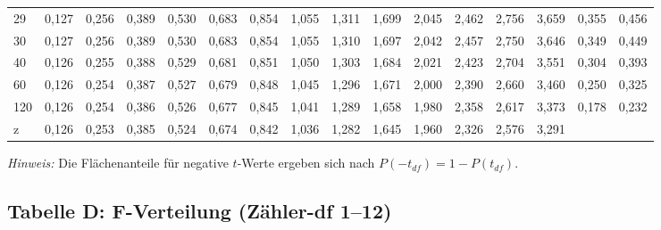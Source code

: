\documentclass[
]{article}
\begin{document}
\begin{table}[!h]
{\begin{tabular}[t]{lccccccccccccccc}
29 & 0,127 & 0,256 & 0,389 & 0,530 & 0,683 & 0,854 & 1,055 & 1,311 & 1,699 & 2,045 & 2,462 & 2,756 & 3,659 & 0,355 & 0,456\\
30 & 0,127 & 0,256 & 0,389 & 0,530 & 0,683 & 0,854 & 1,055 & 1,310 & 1,697 & 2,042 & 2,457 & 2,750 & 3,646 & 0,349 & 0,449\\
40 & 0,126 & 0,255 & 0,388 & 0,529 & 0,681 & 0,851 & 1,050 & 1,303 & 1,684 & 2,021 & 2,423 & 2,704 & 3,551 & 0,304 & 0,393\\
60 & 0,126 & 0,254 & 0,387 & 0,527 & 0,679 & 0,848 & 1,045 & 1,296 & 1,671 & 2,000 & 2,390 & 2,660 & 3,460 & 0,250 & 0,325\\
120 & 0,126 & 0,254 & 0,386 & 0,526 & 0,677 & 0,845 & 1,041 & 1,289 & 1,658 & 1,980 & 2,358 & 2,617 & 3,373 & 0,178 & 0,232\\
z & 0,126 & 0,253 & 0,385 & 0,524 & 0,674 & 0,842 & 1,036 & 1,282 & 1,645 & 1,960 & 2,326 & 2,576 & 3,291 &  & \\
\bottomrule
\end{tabular}}
\end{table}

\emph{Hinweis:} Die Flächenanteile für negative \(t\)-Werte ergeben sich
nach \(P(-t_{df}) = 1 - P(t_{df})\).

\newpage

\subsection{Tabelle D: F-Verteilung (Zähler-df
1--12)}\label{tabelle-d-f-verteilung-zuxe4hler-df-112}
\end{document}
